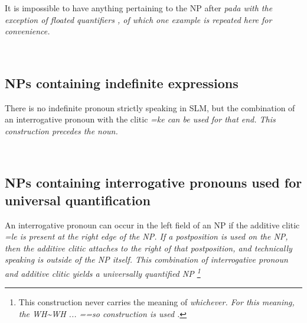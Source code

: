 It is impossible to have anything pertaining to the NP after \em pada \em with the exception of floated quantifiers , of which one example is repeated here for convenience.

 \\

\subsection{NPs containing indefinite expressions}\label{sec:nppp:NPscontainingindefiniteexpressions}
There is no indefinite pronoun strictly speaking in SLM, but the combination of an interrogative pronoun with the clitic  \em =ke \em can be used for that end.  This construction precedes the noun.

 \\

%
\subsection{NPs containing interrogative pronouns used for universal quantification}\label{sec:nppp:NPscontaininginterrogativepronounsusedforuniversalquantification}
An interrogative pronoun can occur in the left field of an NP if the additive clitic \em =le \em is present at the right edge of the NP. If a postposition is used on the NP, then the additive clitic attaches to the right of that postposition, and technically speaking is outside of the NP itself. This combination of interrogative pronoun and additive clitic yields a universally quantified NP
\footnote{This construction never carries the meaning of \em whichever\em. For this meaning, the WH\~{}WH ... =\em=so \em construction is used .}

